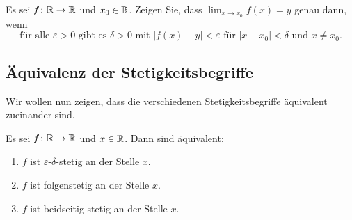 \documentclass[a4paper,10pt]{article}
\begin{document}
\begin{question}\label{qst: Charakterisierung beidseitiger Grenzwert}
 Es sei $f \colon \mathbb{R} \to \mathbb{R}$ und $x_0 \in \mathbb{R}$. Zeigen Sie, dass $\lim_{x \to x_0} f(x) = y$ genau dann, wenn
 \[
  \text{für alle $\varepsilon > 0$ gibt es $\delta > 0$ mit $|f(x)-y| < \varepsilon$ für $|x-x_0| < \delta$ und $x \neq x_0$}.
 \]
\end{question}


\subsection{Äquivalenz der Stetigkeitsbegriffe}


Wir wollen nun zeigen, dass die verschiedenen Stetigkeitsbegriffe äquivalent zueinander sind.


\begin{prop}
 Es sei $f \colon \mathbb{R} \to \mathbb{R}$ und $x \in \mathbb{R}$. Dann sind äquivalent:
 \begin{enumerate}
  \item\label{enum: epsilon-delta-stetig}
   $f$ ist $\varepsilon$-$\delta$-stetig an der Stelle $x$.
  \item\label{enum: folgenstetig}
   $f$ ist folgenstetig an der Stelle $x$.
  \item\label{enum: beidseitig stetig}
   $f$ ist beidseitig stetig an der Stelle $x$.
 \end{enumerate}
\end{prop}
\end{document}
